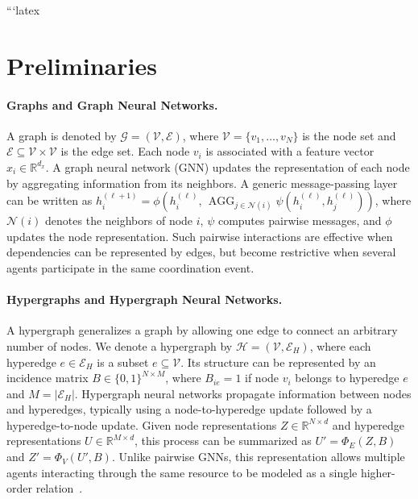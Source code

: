 \documentclass{article} %
\begin{document}
```latex
\section{Preliminaries}
\label{sec:preliminaries}

\paragraph{Graphs and Graph Neural Networks.}
A graph is denoted by $\mathcal{G}=(\mathcal{V},\mathcal{E})$, where $\mathcal{V}=\{v_1,\ldots,v_N\}$ is the node set and $\mathcal{E}\subseteq\mathcal{V}\times\mathcal{V}$ is the edge set. Each node $v_i$ is associated with a feature vector $x_i\in\mathbb{R}^{d_x}$. A graph neural network (GNN) updates the representation of each node by aggregating information from its neighbors. A generic message-passing layer can be written as $h_i^{(\ell+1)}=\phi\!\left(h_i^{(\ell)},\,\operatorname{AGG}_{j\in\mathcal{N}(i)}\psi(h_i^{(\ell)},h_j^{(\ell)})\right)$, where $\mathcal{N}(i)$ denotes the neighbors of node $i$, $\psi$ computes pairwise messages, and $\phi$ updates the node representation. Such pairwise interactions are effective when dependencies can be represented by edges, but become restrictive when several agents participate in the same coordination event.

\paragraph{Hypergraphs and Hypergraph Neural Networks.}
A hypergraph generalizes a graph by allowing one edge to connect an arbitrary number of nodes. We denote a hypergraph by $\mathcal{H}=(\mathcal{V},\mathcal{E}_H)$, where each hyperedge $e\in\mathcal{E}_H$ is a subset $e\subseteq\mathcal{V}$. Its structure can be represented by an incidence matrix $B\in\{0,1\}^{N\times M}$, where $B_{ie}=1$ if node $v_i$ belongs to hyperedge $e$ and $M=|\mathcal{E}_H|$. Hypergraph neural networks propagate information between nodes and hyperedges, typically using a node-to-hyperedge update followed by a hyperedge-to-node update. Given node representations $Z\in\mathbb{R}^{N\times d}$ and hyperedge representations $U\in\mathbb{R}^{M\times d}$, this process can be summarized as $U'=\Phi_E(Z,B)$ and $Z'=\Phi_V(U',B)$. Unlike pairwise GNNs, this representation allows multiple agents interacting through the same resource to be modeled as a single higher-order relation~\cite{jain2026hmagat}.
\end{document}
